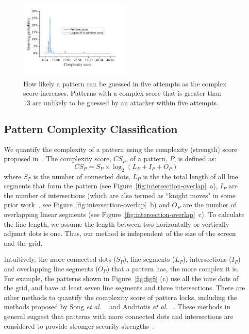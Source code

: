         \begin{figure}[!t]
            \centering
            \includegraphics[width=0.5\textwidth]{fig/guess_prob.pdf}
            \caption{How likely a pattern can be guessed in five attempts as the complex score increases. Patterns with a complex score that is greater than 13 are 
             unlikely to be guessed by an attacker within five attempts.}
            \label{fig:guessing-probability}
        \end{figure}

    \subsection{Pattern Complexity Classification}
    We quantify the complexity of a pattern using the complexity (strength) score proposed in~\cite{sun2014dissecting}.
        The complexity score, $CS_{P}$, of a pattern, $P$, is defined as:
    \begin{equation}
      CS_{P}=S_{P}\times\log_{2}(L_{P}+I_{P}+O_{P})
    \label{equ:compscore}
    \end{equation}
    where $S_{P}$ is the number of connected dots, $L_{P}$ is the the total length of all line segments that form the pattern (see Figure~\ref{fig:intersection-overlap}~a), $I_{P}$ are the number of intersections (which are also termed as ``knight moves" in some prior work~\cite{vonZezschwitz:2015:EDB:2702123.2702202}, see Figure~\ref{fig:intersection-overlap}~b) and $O_{P}$ are the number of overlapping linear segments (see Figure~\ref{fig:intersection-overlap}~c).  To calculate the line length, we assume the length between two horizontally or vertically adjunct dots is one. Thus, our method is independent of the size of the screen and the grid.


    Intuitively, the more connected dots ($S_{P}$), line segments ($L_{P}$),
    intersections ($I_{P}$) and overlapping line segments ($O_{P}$) that a
    pattern has, the more complex it is. For example, the patterns shown in
    Figure~\ref{fig:fig8} (c) use all the nine dots of the grid, and have  at
    least seven line segments and three intersections. 
    There are other methods to quantify the complexity score of pattern locks, including the methods proposed by Song \emph{et al.} ~\cite{Song2015On} and Andriotis \emph{et al.}
    ~\cite{Andriotis2014Complexity}. These methods in general suggest that patterns with more connected dots and intersections are considered to provide stronger security strengths~\cite{Heidt2016Refining}. 
    

